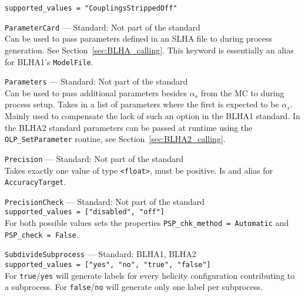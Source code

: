 \begin{basedescript}{\desclabelstyle{\pushlabel}}
        \lstinline[style=in]|supported_values = "CouplingsStrippedOff"|
     \item[\hspace{-1em}]\colorbox{gray!30}{\lstinline[style=in]|ParameterCard|} --- Standard: Not part of the standard\vspace{0.1cm}\\
        Can be used to pass parameters defined in an SLHA file to \gosam during process generation. See Section~\ref{sec:BLHA_calling}. This keyword is essentially an alias for BLHA1's \lstinline[style=in]|ModelFile|.
    \item[\hspace{-1em}]\colorbox{gray!30}{\lstinline[style=in]|Parameters|} --- Standard: Not part of the standard\vspace{0.1cm}\\
        Can be used to pass additional parameters besides $\alpha_s$ from the MC to \gosam during process setup. Takes in a list of parameters where the first is expected to be $\alpha_s$. Mainly used to compensate the lack of such an option in the BLHA1 standard. In the BLHA2 standard parameters can be passed at runtime using the \texttt{OLP\_SetParameter} routine, see Section~\ref{sec:BLHA2_calling}.
    \item[\hspace{-1em}]\colorbox{gray!30}{\lstinline[style=in]|Precision|} --- Standard: Not part of the standard\vspace{0.1cm}\\
        Takes exactly one value of type \texttt{<float>}, must be positive. Is and alias for \texttt{AccuracyTarget}.
    \item[\hspace{-1em}]\colorbox{gray!30}{\lstinline[style=in]|PrecisionCheck|} --- Standard: Not part of the standard\vspace{0.1cm}\\
        \lstinline[style=in]|supported_values = ["disabled", "off"]|\\
        For both possible values sets the properties \lstinline[style=in]|PSP_chk_method = Automatic| and  \lstinline[style=in]|PSP_check = False|.
    \item[\hspace{-1em}]\colorbox{gray!30}{\lstinline[style=in]|SubdivideSubprocess|} --- Standard: BLHA1, BLHA2\vspace{0.1cm}\\
        \lstinline[style=in]|supported_values = ["yes", "no", "true", "false"]|\\
        For \texttt{true}/\texttt{yes} \gosam will generate labels for every helicity configuration contributing to a subprocess. For \texttt{false}/\texttt{no} \gosam will generate only one label per subprocess.
\end{basedescript}

